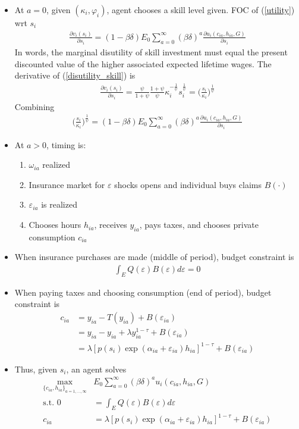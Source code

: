 \documentclass{article}
\begin{document}
\begin{itemize}
\item At $a = 0$, given $(\kappa_i, \varphi_i)$, agent chooses a skill level given. FOC of (\ref{utility}) wrt $s_i$
\begin{align*}
\frac{\partial v_i(s_i)}{\partial s_i} = (1 - \beta \delta) E_0 \sum_{a = 0}^\infty (\beta \delta)^a \frac{\partial u_i(c_{ia}, h_{ia}, G)}{\partial s_i}
\end{align*}
In words, the marginal disutility of skill investment must equal the present discounted value of the higher associated expected lifetime wages. The derivative of (\ref{disutility_skill}) is
\begin{align*}
\frac{\partial v_i(s_i)}{\partial s_i} = \frac{\psi}{1 + \psi} \frac{1 + \psi}{\psi}\kappa_i^{-\frac{1}{\psi}} s_i^\frac{1}{\psi} = \Bigg(\frac{s_i}{\kappa_i}\Bigg)^{\frac{1}{\psi}}
\end{align*}
Combining
\begin{align}
\Bigg(\frac{s_i}{\kappa_i}\Bigg)^{\frac{1}{\psi}} = (1 - \beta \delta) E_0 \sum_{a = 0}^\infty (\beta \delta)^a \frac{\partial u_i(c_{ia}, h_{ia}, G)}{\partial s_i}
\end{align}
\item At $a > 0$, timing is: 
\begin{enumerate}
\item $\omega_{ia}$ realized
\item Insurance market for $\varepsilon$ shocks opens and individual buys claims $B(\cdot)$
\item $\varepsilon_{ia}$ is realized
\item Chooses hours $h_{ia}$, receives $y_{ia}$, pays taxes, and chooses private consumption $c_{ia}$
\end{enumerate}
\item When insurance purchases are made (middle of period), budget constraint is
\begin{align}
\int_E Q(\varepsilon) B(\varepsilon) d\varepsilon = 0
\end{align}
\item When paying taxes and choosing consumption (end of period), budget constraint is
\begin{align}
c_{ia} 
&= y_{ia} - T(y_{ia})  + B(\varepsilon_{ia})\nonumber \\
&= y_{ia} - y_{ia} + \lambda y_{ia}^{1-\tau}  + B(\varepsilon_{ia})\nonumber \\
&= \lambda [p(s_i) \exp(\alpha_{ia} + \varepsilon_{ia}) h_{ia}]^{1-\tau} + B(\varepsilon_{ia})
\end{align}
\item Thus, given $s_i$, an agent solves
\begin{align*}
\max_{\{c_{ia}, h_{ia}\}_{a = 1, ..., \infty}} &
 E_0 \sum_{a = 0}^\infty (\beta \delta)^a u_i(c_{ia}, h_{ia}, G)\\
\text{s.t. }
0 &= \int_E Q(\varepsilon) B(\varepsilon) d\varepsilon \\
c_{ia} &= \lambda [p(s_i) \exp(\alpha_{ia} + \varepsilon_{ia}) h_{ia}]^{1-\tau} + B(\varepsilon_{ia})
\end{align*}
\end{itemize}
\end{document}
